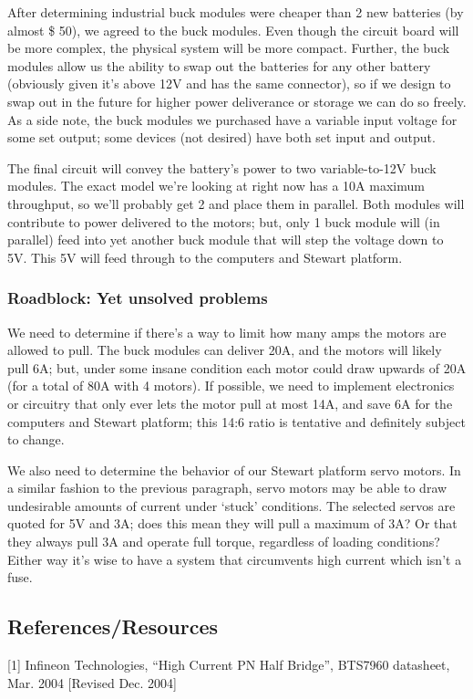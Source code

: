 \documentclass[a4paper, 10pt]{article}
\begin{document}
		After determining industrial buck modules were cheaper than 2 new batteries (by almost \$ 50), we agreed to the buck modules. Even though the circuit board will be more complex, the physical system will be more compact. Further, the buck modules allow us the ability to swap out the batteries for any other battery (obviously given it's above 12V and has the same connector), so if we design to swap out in the future for higher power deliverance or storage we can do so freely. As a side note, the buck modules we purchased have a variable input voltage for some set output; some devices (not desired) have both set input and output.
		
		The final circuit will convey the battery's power to two variable-to-12V buck modules. The exact model we're looking at right now has a 10A maximum throughput, so we'll probably get 2 and place them in parallel. Both modules will contribute to power delivered to the motors; but, only 1 buck module will (in parallel) feed into yet another buck module that will step the voltage down to 5V. This 5V will feed through to the computers and Stewart platform.
		
		\subsubsection{Roadblock: Yet \textbf{unsolved} problems}
		We need to determine if there's a way to limit how many amps the motors are allowed to pull. The buck modules can deliver 20A, and the motors will likely pull 6A; but, under some insane condition each motor could draw upwards of 20A (for a total of 80A with 4 motors). If possible, we need to implement electronics or circuitry that only ever lets the motor pull at most 14A, and save 6A for the computers and Stewart platform; this 14:6 ratio is tentative and definitely subject to change.
		
		We also need to determine the behavior of our Stewart platform servo motors. In a similar fashion to the previous paragraph, servo motors may be able to draw undesirable amounts of current under `stuck' conditions. The selected servos are quoted for 5V and 3A; does this mean they will pull a maximum of 3A? Or that they always pull 3A and operate full torque, regardless of loading conditions? Either way it's wise to have a system that circumvents high current which isn't a fuse.
		
	\subsection{References/Resources}
		[1] Infineon Technologies, ``High Current PN Half Bridge'', BTS7960 datasheet, Mar. 2004 [Revised Dec. 2004]
  
\end{document}
